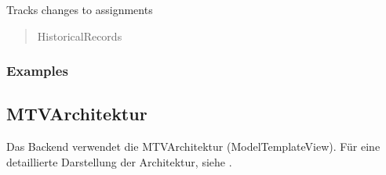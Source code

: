 \documentclass[a4paper,12pt,ngerman]{sphinxmanual}
\begin{document}

\begin{fulllineitems}
\label{\detokenize{sections/models:pages_app.models.PageBlock.history}}
\pysigstartsignatures
\pysigline
{}
\pysigstopsignatures
\sphinxAtStartPar
Tracks changes to assignments
\begin{quote}\begin{description}
\sphinxAtStartPar
HistoricalRecords

\end{description}\end{quote}

\end{fulllineitems}

\subsubsection*{Examples}

\begin{sphinxVerbatim}[commandchars=\\\{\}]
  
  
  
    
    
    
\end{sphinxVerbatim}


\subsection{MTV\sphinxhyphen{}Architektur}
\label{\detokenize{sections/models:mtv-architektur}}
\sphinxAtStartPar
Das Backend verwendet die MTV\sphinxhyphen{}Architektur (Model\sphinxhyphen{}Template\sphinxhyphen{}View). Für eine detaillierte Darstellung der Architektur, siehe {\hyperref[\detokenize{sections/diagramme:mtv-architecture}]{}}.
\end{document}
